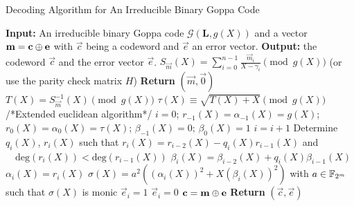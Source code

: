 \begin{algorithm}[ht!]
	\centering
	\caption{Decoding Algorithm for An Irreducible Binary Goppa Code}
	\label{alg:errCorrIrrBinGoppa}
	\begin{algorithmic}
		\State \textbf{Input:} An irreducible binary Goppa code $\mathcal{G}\left(\mathbf{L}, g\left(X\right)\right)$ and a vector $\boldsymbol{\mathrm{m}} = \boldsymbol{\mathrm{c}} \mathbin{\oplus} \boldsymbol{\mathrm{e}}$ with $\vec{c}$ being a codeword and $\vec{e}$ an error vector.
		\Statex
		\State \textbf{Output:} the codeword $\vec{c}$ and the error vector $\vec{e}$.
		\Statex
		\State $S_{\vec{m}}\left(X\right) = \sum\limits_{i=0}^{n-1} \frac{\vec{m}_i}{X - \gamma_i} \pmod {g\left(X\right)}$
		\State (or use the parity check matrix $H$)
		\Statex
			\State \textbf{Return} $\left(\vec{m}, \vec{0}\right)$
		\Else
			\State $T\left(X\right) = S_{\vec{m}}^{-1}\left(X\right) \pmod {g\left(X\right)}$
			\State $\tau\left(X\right) \equiv \sqrt{T\left(X\right) + X} \pmod {g\left(X\right)}$
		\EndIf
		\Statex
		\State /*Extended euclidean algorithm*/
		\State $i = 0$; $r_{-1}\left(X\right) = \alpha_{-1}\left(X\right) = g\left(X\right)$; $r_0\left(X\right) = \alpha_0\left(X\right) = \tau\left(X\right)$; $\beta_{-1}\left(X\right) = 0$; $\beta_0\left(X\right) = 1$
			\State $i = i + 1$
			\State Determine $q_i\left(X\right)$, $r_i\left(X\right)$ such that $r_i\left(X\right) = r_{i-2}\left(X\right) - q_i\left(X\right) r_{i-1}\left(X\right)$ and
			\State $\quad\mathrm{deg}\left(r_i\left(X\right)\right) < \mathrm{deg}\left(r_{i-1}\left(X\right)\right)$
			\State $\beta_i\left(X\right) = \beta_{i-2}\left(X\right) + q_i\left(X\right) \beta_{i-1}\left(X\right)$
			\State $\alpha_i\left(X\right) = r_i\left(X\right)$
		\EndWhile
		\Statex
		\State $\sigma\left(X\right) = a^2 \left(\left(\alpha_i\left(X\right)\right)^2 + X \left(\beta_i\left(X\right)\right)^2\right)$ with $a \in \mathbb{F}_{2^m}$ such that $\sigma\left(X\right)$ is monic
		\Statex
				\State $\vec{e}_i = 1$
			\Else
				\State $\vec{e}_i = 0$
			\EndIf
			\State $\boldsymbol{\mathrm{c}} = \boldsymbol{\mathrm{m}} \mathbin{\oplus} \boldsymbol{\mathrm{e}}$
		\EndFor
		\Statex
		\State \textbf{Return} $\left(\vec{c}, \vec{e}\right)$
	\end{algorithmic}
\end{algorithm}



